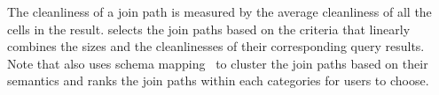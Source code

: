 The cleanliness of a join path is measured by the average cleanliness of all the cells in the result. \dcv selects the join paths based on the criteria that linearly combines the sizes and the cleanlinesses of their corresponding query results. Note that \dcv also uses schema mapping~\cite{DBLP:conf/cidr/StonebrakerBIBCZPX13} to cluster the join paths based on their semantics and ranks the join paths within each categories for users to choose.







